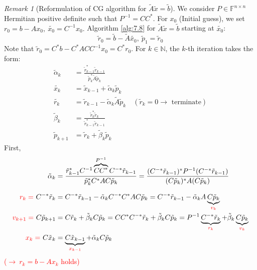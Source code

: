 \documentclass[12pt]{article}
\theoremstyle{definition}
\theoremstyle{remark}
\newtheorem*{remark*}{Remark}
\numberwithin{equation}{section}
\newcommand{\F}{\mathbb{F}}
\newcommand{\N}{\mathbb{N}}
\begin{document}
\begin{remark*}[Reformulation of CG algorithm for $\tilde{A} \tilde{x} = \tilde{b}$]
  We consider $P \in \F^{n\times n}$ Hermitian positive definite such that $P^{-1} = CC^*$. For $x_0$ (Initial guess), we set $r_0 = b-Ax_0,\ \tilde{x_0} = C^{-1} x_0.$ Algorithm \ref{alg:7.8} for $\tilde{A} \tilde{x} = \tilde{b}$ starting at $\tilde{x_0}$:
  \begin{equation*}
    \tilde{r}_0 = \tilde{b} - \tilde{A} \tilde{x_0},\ \tilde{p}_1 = \tilde{r}_0
  \end{equation*}
  Note that $\tilde{r}_0 = C^*b - C^*A C C^{-1} x_0 = C^* r_0$. For $k \in \N$, the $k$-th iteration takes the form:
  \begin{align*}
    \tilde{\alpha}_k &= \frac{\tilde{r}_{k-1}^* \tilde{r}_{k-1}}{\tilde{p}_k^* \tilde{A} \tilde{p}_k}\\
    \tilde{x_k} &= \tilde{x}_{k-1} + \tilde{\alpha}_k \tilde{p}_k\\
    \tilde{r_k} &= \tilde{r}_{k-1} - \tilde{\alpha}_k \tilde{A} \tilde{p}_k \quad (\tilde{r}_k = 0 \rightarrow \text{ terminate})\\
    \tilde{\beta}_k &= \frac{\tilde{r}_k^* \tilde{r}_k}{\tilde{r}_{k-1}^* \tilde{r}_{k-1}}\\
    \tilde{p}_{k+1} &= \tilde{r}_k + \tilde{\beta}_k \tilde{p}_k
  \end{align*}
  First,
  \begin{align*}
    \tilde{\alpha}_k &= \frac{\tilde{r}_{k-1}^* C^{-1} \overbrace{C C^*}^{P^{-1}} C^{-*} \tilde{r}_{k-1}}{\tilde{p}_k^* C^* A C \tilde{p}_k} = \frac{(C^{-*}\tilde{r}_{k-1})^*P^{-1}(C^{-*}\tilde{r}_{k-1})}{(C \tilde{p}_k)^* A (C \tilde{p}_k)} \\[0.5\baselineskip]
    \textcolor{red}{r_k=\ }C^{-*}\tilde{r}_{k} &= C^{-*} \tilde{r}_{k-1} - \tilde{\alpha}_k C^{-*} C^* A C \tilde{p}_k = C^{-*} \tilde{r}_{k-1} - \tilde{\alpha}_k A \underbrace{C \tilde{p}_k}_{\textcolor{red}{v_k}}\\
    \textcolor{red}{v_{k+1}=\ }C \tilde{p}_{k+1} &= C \tilde{r}_k + \tilde{\beta}_k C \tilde{p}_k = C C^* C^{-*} \tilde{r}_{k} + \tilde{\beta}_k C \tilde{p}_k = P^{-1} \underbrace{C^{-*} \tilde{r}_{k}}_{\textcolor{red}{r_k}} + \tilde{\beta}_k \underbrace{C \tilde{p}_k}_{\textcolor{red}{v_k}}\\
    \textcolor{red}{x_k=\ }C \tilde{x}_k &= \underbrace{C \tilde{x}_{k-1}}_{\textcolor{red}{x_{k-1}}} + \tilde{\alpha}_k C \tilde{p}_k
  \end{align*}
  \textcolor{red}{($\rightarrow\ r_k = b - Ax_k$ holds)}


\end{remark*}
\end{document}
